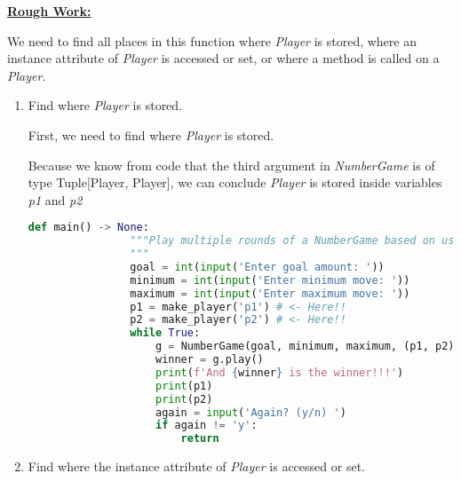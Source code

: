 \documentclass[12pt]{article}
\begin{document}
\begin{enumerate}[1.]
    \bigskip

    \begin{mdframed}
        \underline{\textbf{Rough Work:}}

        \bigskip

        We need to find all places in this function where \textit{Player} is stored,
        where an instance attribute of \textit{Player} is accessed or set, or where
        a method is called on a \textit{Player}.

        \bigskip

        \begin{enumerate}[1.]
            \item Find where \textit{Player} is stored.

            \bigskip

            \begin{mdframed}

            First, we need to find where \textit{Player} is stored.

            \bigskip

            Because we know from code that the third argument in \textit{NumberGame}
            is of type Tuple[Player, Player], we can conclude \textit{Player} is
            stored inside variables \textit{p1} and \textit{p2}

            \begin{lstlisting}[language=Python]
            def main() -> None:
                """Play multiple rounds of a NumberGame based on user input settings.
                """
                goal = int(input('Enter goal amount: '))
                minimum = int(input('Enter minimum move: '))
                maximum = int(input('Enter maximum move: '))
                p1 = make_player('p1') # <- Here!!
                p2 = make_player('p2') # <- Here!!
                while True:
                    g = NumberGame(goal, minimum, maximum, (p1, p2)) # <- Here!!
                    winner = g.play()
                    print(f'And {winner} is the winner!!!')
                    print(p1)
                    print(p2)
                    again = input('Again? (y/n) ')
                    if again != 'y':
                        return
            \end{lstlisting}


            \end{mdframed}

            \item Find where the instance attribute of \textit{Player} is accessed or set.
            \bigskip


\end{enumerate}
\end{mdframed}
\end{enumerate}
\end{document}
